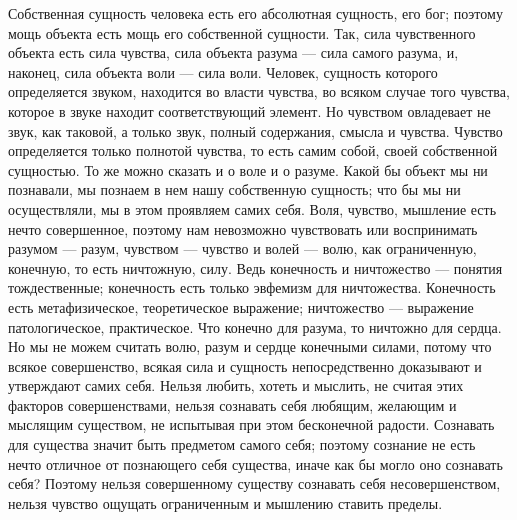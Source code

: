 \documentclass[12pt,oneside]{book}
\begin{document}
Собственная сущность человека есть его абсолютная сущность, его бог; поэтому мощь объекта есть мощь его собственной сущности. Так, сила чувственного объекта есть сила чувства, сила объекта разума --- сила самого разума, и, наконец, сила объекта воли --- сила воли. Человек, сущность которого определяется звуком, находится во власти чувства, во всяком случае того чувства, которое в звуке находит соответствующий элемент. Но чувством овладевает не звук, как таковой, а только звук, полный содержания, смысла и чувства. Чувство определяется только полнотой чувства, то есть самим собой, своей собственной сущностью. То же можно сказать и о воле и о разуме. Какой бы объект мы ни познавали, мы познаем в нем нашу собственную сущность; что бы мы ни осуществляли, мы в этом проявляем самих себя. Воля, чувство, мышление есть нечто совершенное, поэтому нам невозможно чувствовать или воспринимать разумом --- разум, чувством --- чувство и волей --- волю, как ограниченную, конечную, то есть ничтожную, силу. Ведь конечность и ничтожество --- понятия тождественные; конечность есть только эвфемизм для ничтожества. Конечность есть метафизическое, теоретическое выражение; ничтожество --- выражение патологическое, практическое. Что конечно для разума, то ничтожно для сердца. Но мы не можем считать волю, разум и сердце конечными силами, потому что всякое совершенство, всякая сила и сущность непосредственно доказывают и утверждают самих себя. Нельзя любить, хотеть и мыслить, не считая этих факторов совершенствами, нельзя сознавать себя любящим, желающим и мыслящим существом, не испытывая при этом бесконечной радости. Сознавать для существа значит быть предметом самого себя; поэтому сознание не есть нечто отличное от познающего себя существа, иначе как бы могло оно сознавать себя? Поэтому нельзя совершенному существу сознавать себя несовершенством, нельзя чувство ощущать ограниченным и мышлению ставить пределы.
\end{document}
